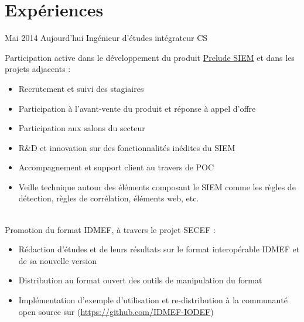 \documentclass[letterpaper]{twentysecondcv} %
\begin{document}
\makeprofile %


\section{Expériences}

\begin{twenty} %
  \twentyitem
      {Mai 2014}
      {Aujourd'hui}
      {Ingénieur d'études intégrateur}
      {CS}
      {}
      {
        \bigskip
        Participation active dans le développement du produit \href{https://www.prelude-siem.com/}{Prelude SIEM} et dans les projets adjacents :
        \\
        \begin{itemize}
        \item Recrutement et suivi des stagiaires
        \item Participation à l'avant-vente du produit et réponse à appel d'offre
        \item Participation aux salons du secteur
        \item R\&D et innovation sur des fonctionnalités inédites du SIEM
        \item Accompagnement et support client au travers de POC
        \item Veille technique autour des éléments composant le SIEM comme les règles de détection, règles de corrélation, éléments web, etc.
        \end{itemize}
        \ \\
        Promotion du format IDMEF, à travers le projet SECEF :
        \\
        \begin{itemize}
        \item Rédaction d'études et de leurs résultats sur le format interopérable IDMEF et de sa nouvelle version
        \item Distribution au format ouvert des outils de manipulation du format
        \item Implémentation d'exemple d'utilisation et re-distribution à la communauté open source sur (\href{https://github.com/IDMEF-IODEF}{https://github.com/IDMEF-IODEF})
        \end{itemize}
      }
      \\


\end{twenty}
\end{document}
